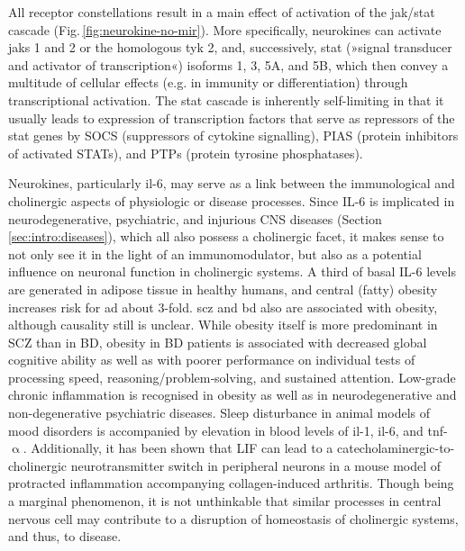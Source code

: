 All receptor constellations result in a main effect of activation of the \acs{jak}/\acs{stat} cascade (Fig.\,\ref{fig:neurokine-no-mir}). More specifically, neurokines can activate \acfp{jak} 1 and 2 or the homologous \ac{tyk} 2, and, successively, \ac{stat} (»signal transducer and activator of transcription«) isoforms 1, 3, 5A, and 5B, which then convey a multitude of cellular effects (e.g. in immunity or differentiation) through transcriptional activation. The \ac{stat} cascade is inherently self-limiting in that it usually leads to expression of transcription factors that serve as repressors of the \ac{stat} genes by SOCS (suppressors of cytokine signalling), PIAS (protein inhibitors of activated STATs), and PTPs (protein tyrosine phosphatases).\cite{Rawlings2004}

Neurokines, particularly \ac{il}-6, may serve as a link between the immunological and cholinergic aspects of physiologic or disease processes. Since IL-6 is implicated in neurodegenerative, psychiatric, and injurious CNS diseases (Section \ref{sec:intro:diseases}), which all also possess a cholinergic facet, it makes sense to not only see it in the light of an immunomodulator, but also as a potential influence on neuronal function in cholinergic systems. A third of basal IL-6 levels are generated in adipose tissue in healthy humans,\cite{Mohamed-Ali1997} and central (fatty) obesity increases risk for \ac{ad} about 3-fold.\cite{Gustafson2004, Profenno2010} \Ac{scz} and \ac{bd} also are associated with obesity, although causality still is unclear. While obesity itself is more predominant in SCZ than in BD, obesity in BD patients is associated with decreased global cognitive ability as well as with poorer performance on individual tests of processing speed, reasoning/problem‐solving, and sustained attention.\cite{Depp2014} Low-grade chronic inflammation is recognised in obesity\cite{Eder2009} as well as in neurodegenerative\cite{Heppner2015} and non-degenerative psychiatric diseases.\cite{Kirkpatrick2013, Takao2013} Sleep disturbance in animal models of mood disorders is accompanied by elevation in blood levels of \ac{il}-1, \ac{il}-6, and \ac{tnf}-$\upalpha$.\cite{Hodes2015} Additionally, it has been shown that LIF can lead to a catecholaminergic-to-cholinergic neurotransmitter switch in peripheral neurons in a mouse model of protracted inflammation accompanying collagen-induced arthritis.\cite{Stangl2015} Though being a marginal phenomenon, it is not unthinkable that similar processes in central nervous cell may contribute to a disruption of homeostasis of cholinergic systems, and thus, to disease.

